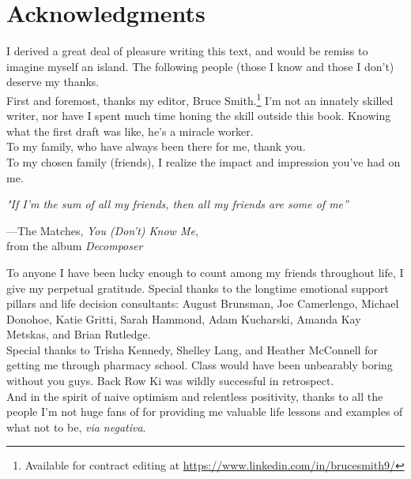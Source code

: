 
\setlength\epigraphwidth{8cm}
\setlength\epigraphrule{0pt}

\chapter{Acknowledgments}\label{Acknowledgments}

I derived a great deal of pleasure writing this text, and would be remiss to imagine myself an island. The following people (those I know and those I don't) deserve my thanks.\\

First and foremost, thanks my editor, Bruce Smith.\footnote{Available for contract editing at \url{https://www.linkedin.com/in/brucesmith9/}} I'm not an innately skilled writer, nor have I spent much time honing the skill outside this book. Knowing what the first draft was like, he's a miracle worker.\\ 

To my family, who have always been there for me, thank you.\\

To my chosen family (friends), I realize the impact and impression you've had on me.\\

\epigraph{\emph{"If I'm the sum of all my friends, then all my friends are some of me”}}{---The Matches, \emph{You (Don't) Know Me},\\ from the album \emph{Decomposer}}

To anyone I have been lucky enough to count among my friends throughout life, I give my perpetual gratitude. Special thanks to the longtime emotional support pillars and life decision consultants: August Brunsman, Joe Camerlengo, Michael Donohoe, Katie Gritti, Sarah Hammond, Adam Kucharski, Amanda Kay Metskas, and Brian Rutledge.\\    

Special thanks to Trisha Kennedy, Shelley Lang, and Heather McConnell for getting me through pharmacy school. Class would have been unbearably boring without you guys. Back Row Ki was wildly successful in retrospect.\\

And in the spirit of naive optimism and relentless positivity, thanks to all the people I'm not huge fans of for providing me valuable life lessons and examples of what not to be, \emph{via negativa}.\\


